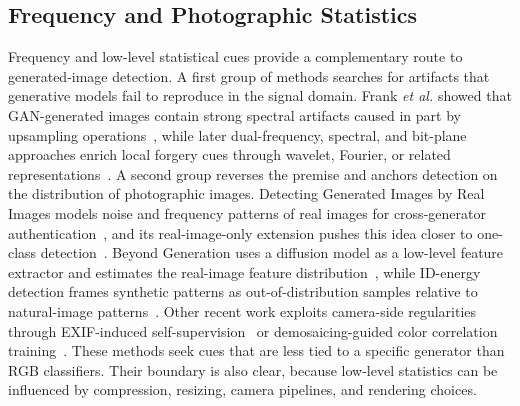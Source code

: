 \documentclass[lettersize,journal]{IEEEtran}
\begin{document}
\subsection{Frequency and Photographic Statistics}
Frequency and low-level statistical cues provide a complementary route to generated-image detection. A first group of methods searches for artifacts that generative models fail to reproduce in the signal domain. Frank \emph{et al.} showed that GAN-generated images contain strong spectral artifacts caused in part by upsampling operations~\cite{frank2020frequency}, while later dual-frequency, spectral, and bit-plane approaches enrich local forgery cues through wavelet, Fourier, or related representations~\cite{yan2025dffreq,karageorgiou2025spai,wang2025lota}. A second group reverses the premise and anchors detection on the distribution of photographic images. Detecting Generated Images by Real Images models noise and frequency patterns of real images for cross-generator authentication~\cite{liu2022realimages}, and its real-image-only extension pushes this idea closer to one-class detection~\cite{bi2023realonly}. Beyond Generation uses a diffusion model as a low-level feature extractor and estimates the real-image feature distribution~\cite{zhong2025beyond}, while ID-energy detection frames synthetic patterns as out-of-distribution samples relative to natural-image patterns~\cite{cai2025generalizable}. Other recent work exploits camera-side regularities through EXIF-induced self-supervision~\cite{zhong2026metadata} or demosaicing-guided color correlation training~\cite{zhong2026color}. These methods seek cues that are less tied to a specific generator than RGB classifiers. Their boundary is also clear, because low-level statistics can be influenced by compression, resizing, camera pipelines, and rendering choices.
\end{document}
